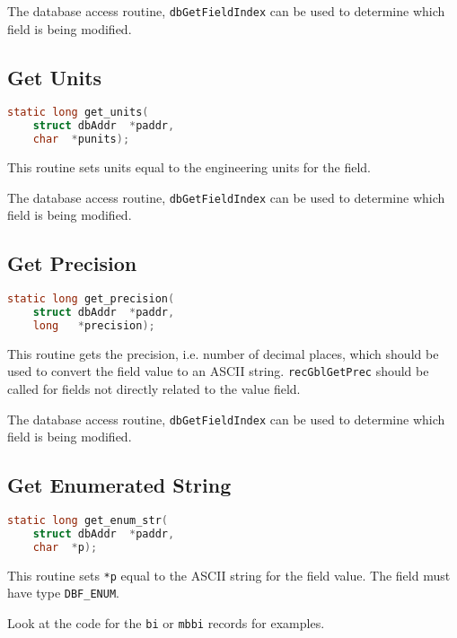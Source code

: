 The database access routine, \verb|dbGetFieldIndex| can be used to determine which field is being modified.

\subsection{Get Units}

\begin{lstlisting}[language=C]
static long get_units(
    struct dbAddr  *paddr,
    char  *punits);
\end{lstlisting}

This routine sets units equal to the engineering units for the field.

The database access routine, \verb|dbGetFieldIndex| can be used to determine which field is being modified.

\subsection{Get Precision}

\begin{lstlisting}[language=C]
static long get_precision(
    struct dbAddr  *paddr,
    long   *precision);
\end{lstlisting}

This routine gets the precision, i.e.
number of decimal places, which should be used to convert the field value to an ASCII string.
\verb|recGblGetPrec| should be called for fields not directly related to the value field.

The database access routine, \verb|dbGetFieldIndex| can be used to determine which field is being modified.

\subsection{Get Enumerated String}

\begin{lstlisting}[language=C]
static long get_enum_str(
    struct dbAddr  *paddr,
    char  *p);
\end{lstlisting}

This routine sets \verb|*p| equal to the ASCII string for the field value.
The field must have type \verb|DBF_ENUM|.

Look at the code for the \verb|bi| or \verb|mbbi| records for examples.


